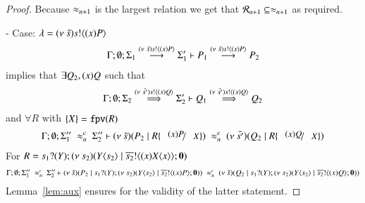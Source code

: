 \begin{proof}
	\noi Because $\approx_{n+1}$ is the largest relation we get that $\mathcal{R}_{n+1} \subseteq \approx_{n+1}$ as required.


	\noi - Case: $\lambda = (\nu\ \tilde{s}) s ! \langle (x)P \rangle$
%
	\begin{eqnarray}
		\Gamma; \emptyset; \Sigma_1 \stackrel{(\nu\ \tilde{s}) s ! \langle (x)P \rangle}{\longrightarrow} \Sigma_1' \vdash P_1 \stackrel{(\nu\ \tilde{s}) s ! \langle (x)P \rangle}{\longrightarrow} P_2 \label{lem:wbc_is_wb4}
	\end{eqnarray}
%
	\noi implies that
	$\exists Q_2, (x)Q$ such that
	\begin{eqnarray}
		\Gamma; \emptyset; \Sigma_2 \stackrel{(\nu\ \tilde{s'}) s ! \langle (x)Q \rangle}{\Longrightarrow} \Sigma_2' \vdash Q_1 \stackrel{(\nu\ \tilde{s'}) s ! \langle (x)Q \rangle}{\Longrightarrow} Q_2  \label{lem:wbc_is_wb5}
	\end{eqnarray}
	and $\forall R$ with $\{X\} = \mathtt{fpv}(R)$
%
	\begin{eqnarray*}
		\Gamma; \emptyset; \Sigma_1''\ \wbc_{n}\ \Sigma_2'' \proves \newsp{\tilde{s}}{P_2 \Par R \subst{(x) P}{X}}\ \wbc_{n}\ 
		\newsp{\tilde{s'}}{Q_2 \Par R\subst{(x) Q}{X}}
	\end{eqnarray*}
%
	\noi For $R = s_1 ? (Y) ; (\nu\ s_2)(Y\langle s_2 \rangle \;|\; \overline{s_2} ! \langle (x) X\langle x \rangle \rangle ;  \mathbf{0})$
%
	\begin{eqnarray*}
		\Gamma; \emptyset; \Sigma_1''\ \wbc_{n}\ \Sigma_2'' \proves \newsp{\tilde{s}}{P_2 \Par \binp{s_1}{Y} \newsp{s_2}{\appl{Y}{s_2} \Par \bout{\dual{s_2}}{\abs{x}{P}}  \inact}}
		\ \wbc_{n}\ 
		\newsp{\tilde{s}}{Q_2 \Par \binp{s_1}{Y} \newsp{s_2}{\appl{Y}{s_2} \Par \bout{\dual{s_2}}{\abs{x}{Q}}  \inact}}
	\end{eqnarray*}
%
	\noi Lemma~\ref{lem:aux} ensures for the validity of the latter statement.


\end{proof}
